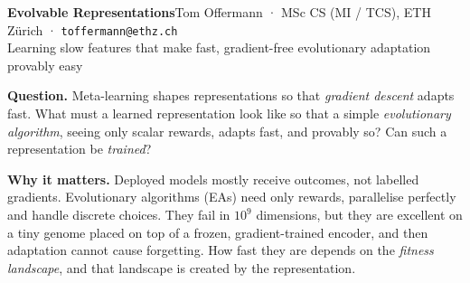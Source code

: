 \documentclass[10pt,a4paper]{article}
\begin{document}
{\Large\textbf{Evolvable Representations}}\hfill{\small Tom Offermann · MSc CS (MI / TCS), ETH Zürich · \texttt{toffermann@ethz.ch}}\\[1pt]
{\large Learning slow features that make fast, gradient-free evolutionary adaptation provably easy}

\vspace{4pt}
\colorbox{fastbg}{\parbox{\dimexpr\linewidth-2\fboxsep}{\textbf{Question.} Meta-learning shapes representations so that \emph{gradient descent} adapts fast. What must a learned representation look like so that a simple \emph{evolutionary algorithm}, seeing only scalar rewards, adapts fast, and provably so? Can such a representation be \emph{trained}?}}

\textbf{Why it matters.} Deployed models mostly receive outcomes, not labelled gradients. Evolutionary algorithms (EAs) need only rewards, parallelise perfectly and handle discrete choices. They fail in $10^9$ dimensions, but they are excellent on a tiny genome placed on top of a frozen, gradient-trained encoder, and then adaptation cannot cause forgetting. How fast they are depends on the \emph{fitness landscape}, and that landscape is created by the representation.

\begin{center}
\end{center}
\end{document}
